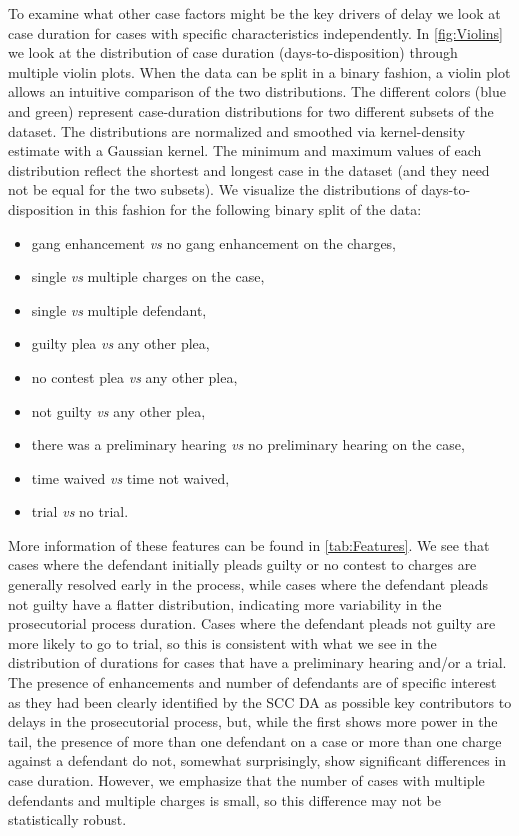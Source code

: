 \documentclass{AISB2008}
\begin{document}
To examine what other case factors might be the key drivers of delay
we look at case duration for cases with specific characteristics
independently. In \autoref{fig:Violins} we look at the distribution of
case duration (days-to-disposition) through multiple violin
plots. When the data can be split in a binary fashion, a violin plot
allows an intuitive comparison of the two distributions. The different
colors (blue and green) represent case-duration distributions for two
different subsets of the dataset. The distributions are normalized and
smoothed via kernel-density estimate with a Gaussian kernel. The
minimum and maximum values of each distribution reflect the shortest
and longest case in the dataset (and they need not be equal for the
two subsets).  We visualize the distributions of days-to-disposition
in this fashion for the following binary split of the data:
\begin{itemize}
\item gang enhancement \emph{vs} no gang enhancement on the charges,
\item single \emph{vs} multiple charges on the case,
\item single \emph{vs} multiple defendant,
\item guilty plea \emph{vs} any other plea,
\item no contest plea \emph{vs} any other plea,
\item not guilty \emph{vs} any other plea,
\item there was a preliminary hearing \emph{vs} no preliminary hearing on the case,
\item time waived \emph{vs}  time not waived,
\item trial \emph{vs} no trial.
\end{itemize}



More information of these features can be found in
\autoref{tab:Features}. We see that cases where the defendant
initially pleads guilty or no contest to charges are generally
resolved early in the process, while cases where the defendant pleads
not guilty have a flatter distribution, indicating more variability in
the prosecutorial process duration. Cases where the defendant pleads
not guilty are more likely to go to trial, so this is consistent with
what we see in the distribution of durations for cases that have
a preliminary hearing and/or a trial.  The presence of enhancements and
number of defendants are of specific interest as they had been clearly
identified by the SCC DA as possible key contributors to delays in the
prosecutorial process, but, while the first shows more power in the
tail, the presence of more than one defendant on a case or more than
one charge against a defendant do not, somewhat surprisingly, show
significant differences in case duration. However, we emphasize that
the number of cases with multiple defendants and multiple charges is
small, so this difference may not be statistically robust.
\end{document}
